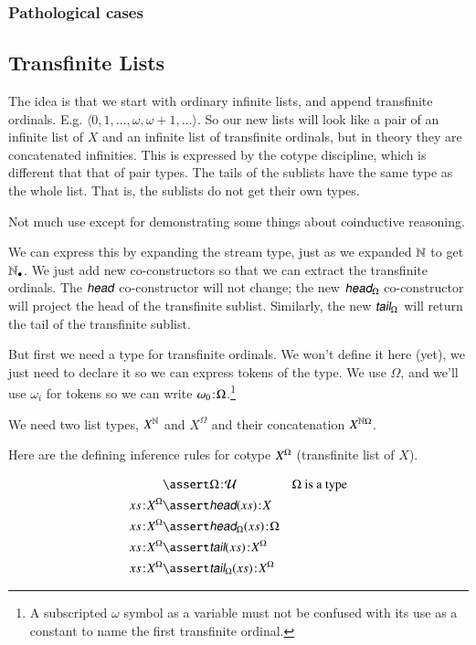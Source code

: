\documentclass{article}
\begin{document}
\subsubsection{Pathological cases}

\subsection{Transfinite Lists}

The idea is that we start with ordinary infinite lists, and append
transfinite ordinals. E.g. \(\langle 0, 1, \ldots, \omega, \omega+1,
\ldots\rangle\). So our new lists will look like a pair of an infinite
list of \(X\) and an infinite list of transfinite ordinals, but in
theory they are concatenated infinities. This is expressed by the
cotype discipline, which is different that that of pair types. The
tails of the sublists have the same type as the whole list. That is,
the sublists do not get their own types.

Not much use except for demonstrating some things about coinductive
reasoning.

We can express this by expanding the stream type, just as we expanded
\(\mathbb{N}\) to get \(\mathbb{N}_{\bullet}\). We just add new co-constructors so that we
can extract the transfinite ordinals. The \(\cohead\) co-constructor
will not change; the new \(\xcohead\) co-constructor will project the
head of the transfinite sublist. Similarly, the new \(\xcotail\) will
return the tail of the transfinite sublist.

But first we need a type for transfinite ordinals. We won't define it
here (yet), we just need to declare it so we can express tokens of the
type. We use \(\Omega\), and we'll use \(\omega_{i}\) for tokens so we
can write \(\omega_0\hspace{1pt}\mathpunct{:}\hspace{-1pt}\Omega\).\footnote{A subscripted \(\omega\)
symbol as a variable must not be confused with its use as a constant
to name the first transfinite ordinal.}

\vspace{2ex}

We need two list types, \(X^{\mathbb{N}}\) and \(X^{\Omega}\) and their
concatenation \(X^{\mathbb{N}\Omega}\).

Here are the defining inference rules for cotype \({X^{\Omega}}\)
(transfinite list of \(X\)).

\begin{align}
  & \linfer \tj{\Omega}{\Univ} & \Omega\ \text{is a type} \\
  \tj{\seq{x}}{\xcolist{X}} & \linfer \tj{\head(\seq{x})}{X} & \\
  \tj{\seq{x}}{\xcolist{X}} & \linfer \tj{\xcohead(\seq{x})}{\Omega} & \\
  \tj{\seq{x}}{\xcolist{X}} & \linfer \tj{\tail(\seq{x})}{\xcolist{X}} & \\
  \tj{\seq{x}}{\xcolist{X}} & \linfer \tj{\xcotail(\seq{x})}{\xcolist{X}} &
\end{align}
\end{document}
